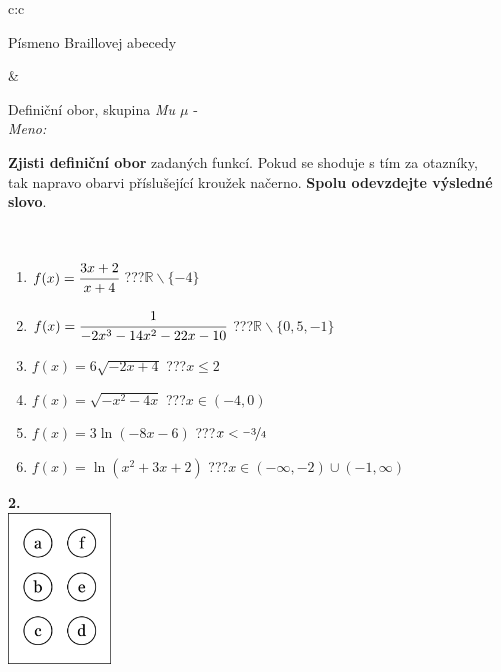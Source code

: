 \documentclass[10pt]{report}
\begin{document}
\begin{tabular}{c:c}
\begin{minipage}[c][104.5mm][t]{0.5\linewidth}
\begin{center}
\begin{minipage}{0.20\linewidth}
\begin{center}
{\small Písmeno Braillovej abecedy}
\end{center}
\end{minipage}
\end{center}
\end{minipage}
&
\begin{minipage}[c][104.5mm][t]{0.5\linewidth}
\begin{center}
\vspace{7mm}
{\huge Definiční obor, skupina \textit{Mu $\mu$} -}\\[5mm]
\textit{Meno:}\phantom{xxxxxxxxxxxxxxxxxxxxxxxxxxxxxxxxxxxxxxxxxxxxxxxxxxxxxxxxxxxxxxxxx}\\[5mm]
\begin{minipage}{0.95\linewidth}
\textbf{Zjisti definiční obor} zadaných funkcí. Pokud se shoduje s tím za otazníky,\\tak napravo obarvi příslušející kroužek načerno. \textbf{Spolu odevzdejte výsledné slovo}.
\end{minipage}
\\[1mm]
\begin{minipage}{0.79\linewidth}
\begin{center}
\begin{varwidth}{\linewidth}
\begin{enumerate}
\normalsizerrr
\item $f(x)=\cfrac{3x+2}{x+4}$\quad \dotfill\; ???\;\dotfill \quad $\mathbb{R}\smallsetminus\{-4\}$
\item $f(x)=\cfrac{1}{-2x^3-14x^2-22x-10}$\quad \dotfill\; ???\;\dotfill \quad $\mathbb{R}\smallsetminus\{0,5,-1\}$
\item $f(x)=6\sqrt{-2x+4}$\quad \dotfill\; ???\;\dotfill \quad $x\leq2$
\item $f(x)=\sqrt{-x^2-4x}$\quad \dotfill\; ???\;\dotfill \quad $x\in(-4 , 0)$
\item $f(x)=3\ln{(-8x-6)}$\quad \dotfill\; ???\;\dotfill \quad $x<\nicefrac{-3}{4}$
\item $f(x)=\ln{(x^2+3x+2)}$\quad \dotfill\; ???\;\dotfill \quad $x\in(-\infty , -2)\cup(-1 , \infty)$
\end{enumerate}
\end{varwidth}
\end{center}
\end{minipage}
\begin{minipage}{0.20\linewidth}
\begin{center}
{\Huge\bfseries 2.} \\[2mm]
\includegraphics[height=40mm]{../images/braille.png}

\end{center}
\end{minipage}
\end{center}
\end{minipage}
\end{tabular}
\end{document}
